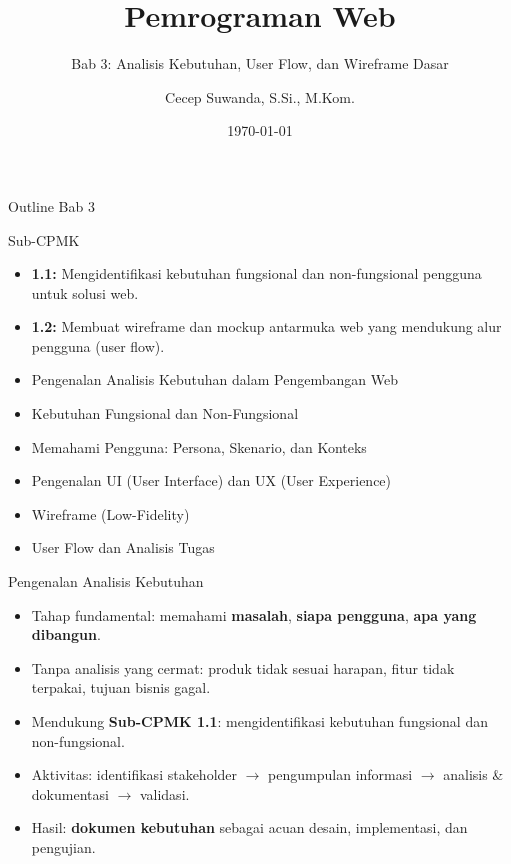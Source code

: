 \documentclass[handout]{beamer}
\title[Bab 3 -- Analisis \& Wireframe]{Pemrograman Web}
\subtitle{Bab 3: Analisis Kebutuhan, User Flow, dan Wireframe Dasar}
\author{Cecep Suwanda, S.Si., M.Kom.}
\institute{Universitas Bale Bandung}
\date{\today}
\begin{document}
\begin{frame}
	\titlepage
\end{frame}

\begin{frame}[shrink=15]{Outline Bab 3}
	\begin{block}{Sub-CPMK}
		\begin{itemize}
			\item \textbf{1.1:} Mengidentifikasi kebutuhan fungsional dan non-fungsional pengguna untuk solusi web.
			\item \textbf{1.2:} Membuat wireframe dan mockup antarmuka web yang mendukung alur pengguna (user flow).
		\end{itemize}
	\end{block}
	\begin{itemize}
		\item Pengenalan Analisis Kebutuhan dalam Pengembangan Web
		\item Kebutuhan Fungsional dan Non-Fungsional
		\item Memahami Pengguna: Persona, Skenario, dan Konteks
		\item Pengenalan UI (User Interface) dan UX (User Experience)
		\item Wireframe (Low-Fidelity)
		\item User Flow dan Analisis Tugas
	\end{itemize}
\end{frame}

\begin{frame}{Pengenalan Analisis Kebutuhan}
	\begin{itemize}
		\item Tahap fundamental: memahami \textbf{masalah}, \textbf{siapa pengguna}, \textbf{apa yang dibangun}.
		\item Tanpa analisis yang cermat: produk tidak sesuai harapan, fitur tidak terpakai, tujuan bisnis gagal.
		\item Mendukung \textbf{Sub-CPMK 1.1}: mengidentifikasi kebutuhan fungsional dan non-fungsional.
		\item Aktivitas: identifikasi stakeholder $\to$ pengumpulan informasi $\to$ analisis \& dokumentasi $\to$ validasi.
		\item Hasil: \textbf{dokumen kebutuhan} sebagai acuan desain, implementasi, dan pengujian.
	\end{itemize}
\end{frame}
\end{document}
